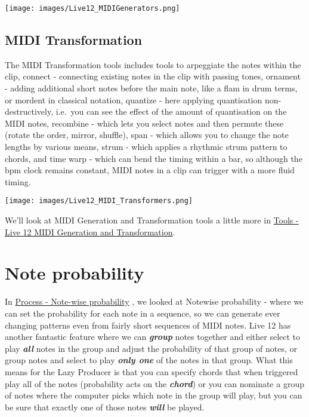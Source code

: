 \documentclass[
  12pt,
  letterpaper,
  oneside,
  open=any]{scrbook}
\begin{document}
\texttt{[image: images/Live12\_MIDIGenerators.png]}

\subsection{MIDI Transformation}\label{midi-transformation}

The MIDI Transformation tools includes tools to arpeggiate the notes
within the clip, connect - connecting existing notes in the clip with
passing tones, ornament - adding additional short notes before the main
note, like a flam in drum terms, or mordent in classical notation,
quantize - here applying quantisation non-destructively, i.e.~you can
see the effect of the amount of quantisation on the MIDI notes,
recombine - which lets you select notes and then permute these (rotate
the order, mirror, shuffle), span - which allows you to change the note
lengths by various means, strum - which applies a rhythmic strum pattern
to chords, and time warp - which can bend the timing within a bar, so
although the bpm clock remains constant, MIDI notes in a clip can
trigger with a more fluid timing.

\texttt{[image: images/Live12\_MIDI\_Transformers.png]}

We'll look at MIDI Generation and Transformation tools a little more in
\hyperref[Chapter-033-Tools-Live12_MIDI_Generation_Transformation]{Tools
- Live 12 MIDI Generation and Transformation}.

\section{Note probability}\label{note-probability}

In \hyperref[Chapter-002-Process-Note_wise_probability]{Process -
Note-wise probability} , we looked at Notewise probability - where we
can set the probability for each note in a sequence, so we can generate
ever changing patterns even from fairly short sequences of MIDI notes.
Live 12 has another fantastic feature where we can \textbf{\emph{group}}
notes together and either select to play \textbf{\emph{all}} notes in
the group and adjust the probability of that group of notes, or group
notes and select to play \textbf{\emph{only one}} of the notes in that
group. What this means for the Lazy Producer is that you can specify
chords that when triggered play all of the notes (probability acts on
the \textbf{\emph{chord}}) or you can nominate a group of notes where
the computer picks which note in the group will play, but you can be
sure that exactly one of those notes \textbf{\emph{will}} be played.
\end{document}
